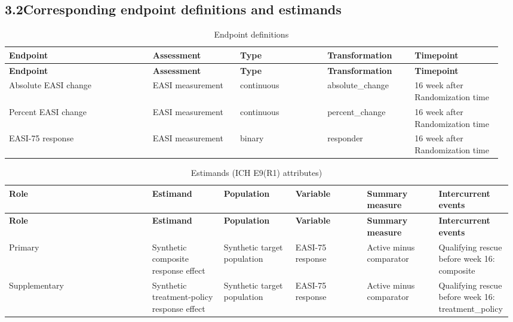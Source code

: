 \documentclass[11pt,a4paper]{article}
\begin{document}
\subsection{3.2\quad Corresponding endpoint definitions and estimands}\label{section.3.2}
\begin{longtable}{@{}>{\RaggedRight}p{0.28\linewidth}>{\RaggedRight}p{0.17\linewidth}>{\RaggedRight}p{0.17\linewidth}>{\RaggedRight}p{0.17\linewidth}>{\RaggedRight}p{0.17\linewidth}@{}}
\caption{Endpoint definitions}\\ \toprule
\textbf{\small Endpoint} & \textbf{\small Assessment} & \textbf{\small Type} & \textbf{\small Transformation} & \textbf{\small Timepoint} \\ \midrule\endfirsthead
\textbf{\small Endpoint} & \textbf{\small Assessment} & \textbf{\small Type} & \textbf{\small Transformation} & \textbf{\small Timepoint} \\ \midrule\endhead
\small Absolute EASI change & \small EASI measurement & \small continuous & \small absolute\_change & \small 16 week after Randomization time \\
\small Percent EASI change & \small EASI measurement & \small continuous & \small percent\_change & \small 16 week after Randomization time \\
\small EASI-75 response & \small EASI measurement & \small binary & \small responder & \small 16 week after Randomization time \\
\bottomrule
\end{longtable}
\begin{longtable}{@{}>{\RaggedRight}p{0.28\linewidth}>{\RaggedRight}p{0.14\linewidth}>{\RaggedRight}p{0.14\linewidth}>{\RaggedRight}p{0.14\linewidth}>{\RaggedRight}p{0.14\linewidth}>{\RaggedRight}p{0.14\linewidth}@{}}
\caption{Estimands (ICH E9(R1) attributes)}\\ \toprule
\textbf{\small Role} & \textbf{\small Estimand} & \textbf{\small Population} & \textbf{\small Variable} & \textbf{\small Summary measure} & \textbf{\small Intercurrent events} \\ \midrule\endfirsthead
\textbf{\small Role} & \textbf{\small Estimand} & \textbf{\small Population} & \textbf{\small Variable} & \textbf{\small Summary measure} & \textbf{\small Intercurrent events} \\ \midrule\endhead
\small Primary & \small Synthetic composite response effect & \small Synthetic target population & \small EASI-75 response & \small Active minus comparator & \small Qualifying rescue before week 16: composite \\
\small Supplementary & \small Synthetic treatment-policy response effect & \small Synthetic target population & \small EASI-75 response & \small Active minus comparator & \small Qualifying rescue before week 16: treatment\_policy \\
\bottomrule
\end{longtable}
\end{document}
